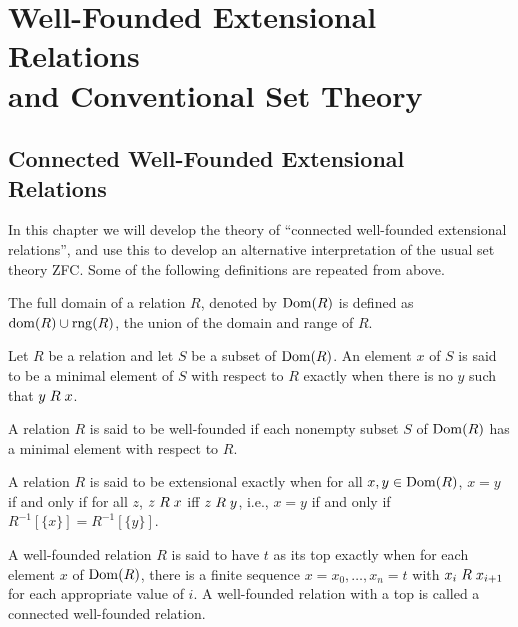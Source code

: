 \chapter[Well-Founded Extensional Relations]{Well-Founded Extensional
Relations\\
and Conventional Set Theory}



\section[Well-Founded Extensional Relations]{Connected Well-Founded
Extensional\\
Relations} 

In this chapter we will develop the theory of ``connected well-founded
extensional relations'', and
use this to develop an alternative interpretation of the usual set theory
ZFC.  Some of the
following definitions are repeated from above.

\begin{definition}
 The {\upshape full domain\/} of a
 relation $R$, denoted by $\mathop{\mathrm{Dom}}(R)$ is defined
 as $\mathop{\mathrm{dom}}(R) \cup \mathop{\mathrm{rng}}(R)$, the union of the domain and range of $R$.
\end{definition}

\begin{definition}
 Let $R$ be a relation and let $S$ be a subset of
 $\mathop{\mathrm{Dom}}(R)$.  An element $x$ of $S$ is said to be a {\upshape minimal
 element} of $S$ with respect to $R$ exactly when there is no $y$
 such that $y\mathrel{R} x$.
\end{definition}

\begin{definition}
 A relation $R$ is said to be {\upshape well-founded}
 if each nonempty subset $S$ of $\mathop{\mathrm{Dom}}(R)$ has a minimal element with
 respect to $R$.
\end{definition}

\begin{definition}
 A relation $R$ is said to be {\upshape extensional}
 exactly when for all $x,y \in \mathop{\mathrm{Dom}}(R)$, $x = y$ if and only if for
 all $z$, $z\mathrel{R} x$ iff $z\mathrel{R} y$, i.e., $x=y$ if and only if
 $R^{-1}[\{x\}]= R^{-1}[\{y\}]$.
\end{definition}

\begin{definition}
 A well-founded relation $R$ is said to have $t$ as
 its {\upshape top} exactly when for each element $x$ of $\mathop{\mathrm{Dom}}(R)$, there
 is a finite sequence $x=x_0,\ldots,x_n=t$ with
 $x_i\mathrel{R} x_{i+1}$ for each appropriate value of $i$.  A well-founded relation
 with a top is called a {\upshape connected} well-founded relation.
\end{definition}

